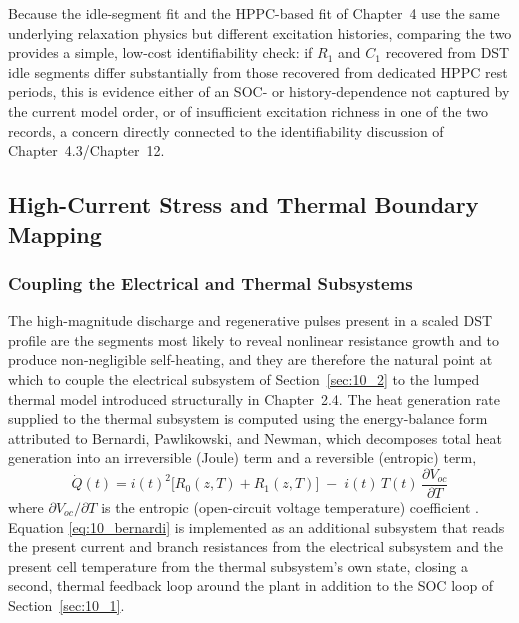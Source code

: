 Because the idle-segment fit and the HPPC-based fit of Chapter~4 use
the same underlying relaxation physics but different excitation
histories, comparing the two provides a simple, low-cost
identifiability check: if $R_1$ and $C_1$ recovered from DST idle
segments differ substantially from those recovered from dedicated
HPPC rest periods, this is evidence either of an SOC- or
history-dependence not captured by the current model order, or of
insufficient excitation richness in one of the two records, a concern
directly connected to the identifiability discussion of
Chapter~4.3/Chapter~12.

\subsection{High-Current Stress and Thermal Boundary Mapping}
\label{sec:10_3_2}

\subsubsection{Coupling the Electrical and Thermal Subsystems}

The high-magnitude discharge and regenerative pulses present in a
scaled DST profile are the segments most likely to reveal nonlinear
resistance growth and to produce non-negligible self-heating, and they
are therefore the natural point at which to couple the electrical
subsystem of Section~\ref{sec:10_2} to the lumped thermal model
introduced structurally in Chapter~2.4. The heat generation rate
supplied to the thermal subsystem is computed using the energy-balance
form attributed to Bernardi, Pawlikowski, and Newman, which decomposes
total heat generation into an irreversible (Joule) term and a
reversible (entropic) term,
\begin{equation}
\dot Q(t) = i(t)^2 \Big[R_0(z,T) + R_1(z,T)\Big] \;-\; i(t)\, T(t) \, \frac{\partial V_{oc}}{\partial T}
\label{eq:10_bernardi}
\end{equation}
where $\partial V_{oc}/\partial T$ is the entropic (open-circuit
voltage temperature) coefficient \cite{bernardi1985}. Equation
\eqref{eq:10_bernardi} is implemented as an additional subsystem that
reads the present current and branch resistances from the electrical
subsystem and the present cell temperature from the thermal
subsystem's own state, closing a second, thermal feedback loop around
the plant in addition to the SOC loop of Section~\ref{sec:10_1}.

